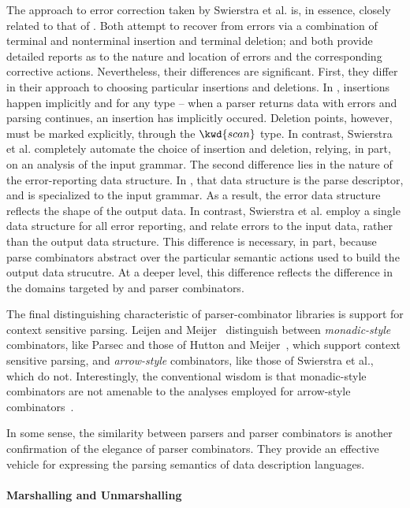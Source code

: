The approach to error correction taken by Swierstra et al. is, in essence, closely related to that of \ddc{}. Both attempt to recover from errors via a combination of terminal and nonterminal insertion and terminal deletion; and both provide detailed reports as to the nature and location of errors and the corresponding corrective actions. Nevertheless, their differences are significant. First, they differ in their approach to choosing particular insertions and deletions. In \ddc{}, insertions happen implicitly and for any type -- when a parser returns data with errors and parsing continues, an insertion has implicitly occured. Deletion points, however, must be marked explicitly, through the $\kwd{scan}$ type. In contrast, Swierstra et al. completely automate the choice of insertion and deletion, relying, in part, on an analysis of the input grammar. The second difference lies in the nature of the error-reporting data structure. In \ddc{}, that data structure is the parse descriptor, and is specialized to the input grammar. As a result, the error data structure reflects the shape of the output data. In contrast, Swierstra et al. employ a single data structure for all error reporting, and relate errors to the input data, rather than the output data structure. This difference is necessary, in part, because parse combinators abstract over the particular semantic actions used to build the output data strucutre. At a deeper level, this difference reflects the difference in the domains targeted by \ddc{} and parser combinators.

The final distinguishing characteristic of parser-combinator libraries is support for context sensitive parsing. Leijen and Meijer~\cite{leijen+:parsec} distinguish between \textit{monadic-style} combinators, like Parsec and those of Hutton and Meijer~\cite{hutton+:monadic-parsing}, which support context sensitive parsing, and \textit{arrow-style} combinators, like those of Swierstra et al., which do not. Interestingly, the conventional wisdom is that monadic-style combinators are not amenable to the analyses employed for arrow-style combinators~\cite{leijen+:parsec,swierstra+:deterministic-error-correcting}.

In some sense, the similarity between \ddc{} parsers and parser combinators is another confirmation of the elegance of parser combinators. They provide an effective vehicle for expressing the parsing semantics of data description languages.

\paragraph*{Marshalling and Unmarshalling}


